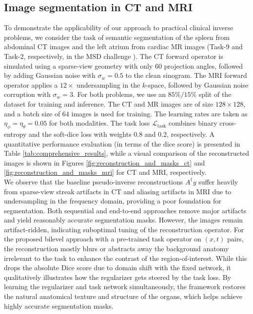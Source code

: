 \subsection{Image segmentation in CT and MRI}
\label{subsec:medical_setup}
To demonstrate the applicability of our approach to practical clinical inverse problems, we consider the task of semantic segmentation of the spleen from abdominal CT images and the left atrium from cardiac MR images (Task-9 and Task-2, respectively, in the MSD challenge \cite{Antonelli2022}). The CT forward operator is simulated using a sparse-view geometry with only 60 projection angles, followed by adding Gaussian noise with $\sigma_w=0.5$ to the clean sinogram. The MRI forward operator applies a $12\times$ undersampling in the $k$-space, followed by Gaussian noise corruption with $\sigma_w=3$. For both problems, we use an $85\%/15\%$ split of the dataset for training and inference. The CT and MR images are of size $128\times 128$, and a batch size of $64$ images is used for training. The learning rates are taken as $\eta_{\phi}=\eta_{\theta}=0.05$ for both modalities. The task loss $\mathcal{L}_{\text{task}}$ combines binary cross-entropy and the soft-dice loss with weights 0.8 and 0.2, respectively. A quantitative performance evaluation (in terms of the dice score) is presented in Table \ref{tab:comprehensive_results}, while a visual comparison of the reconstructed images is shown in Figures \ref{fig:reconstruction_and_masks_ct} and \ref{fig:reconstruction_and_masks_mri} for CT and MRI, respectively.\\
We observe that the baseline pseudo-inverse reconstructions $A^\dagger y$ suffer heavily from sparse-view streak artifacts in CT and aliasing artifacts in MRI due to undersampling in the frequency domain, providing a poor foundation for segmentation. Both sequential and end-to-end approaches remove major artifacts and yield reasonably accurate segmentation masks. However, the images remain artifact-ridden, indicating suboptimal tuning of the reconstruction operator. For the proposed bilevel approach with a pre-trained task operator on $(x,t)$ pairs, the reconstruction mostly blurs or abstracts away the background anatomy irrelevant to the task to enhance the contrast of the region-of-interest. While this drops the absolute Dice score due to domain shift with the fixed network, it qualitatively illustrates how the regularizer gets steered by the task loss. By learning the regularizer and task network simultaneously, the framework restores the natural anatomical texture and structure of the organs, which helps achieve highly accurate segmentation masks.

